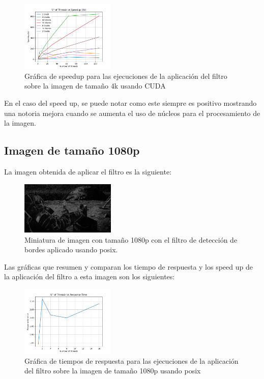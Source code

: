 \begin{figure}[H]
    \centering
    \includegraphics[width=0.4\textwidth]{../plots/cuda_4k_speedup.png}
    \caption{Gráfica de speedup para las ejecuciones de la aplicación del filtro sobre la imagen de tamaño 4k usando CUDA}
\end{figure}

En el caso del speed up, se puede notar como este siempre es positivo mostrando una notoria mejora cuando se aumenta el uso de núcleos para el procesamiento de la imagen.

\subsection{Imagen de tamaño 1080p}

La imagen obtenida de aplicar el filtro es la siguiente:

\begin{figure}[H]
    \centering
    \includegraphics[width=0.4\textwidth]{../plots/1080p.out.jpg}
    \caption{Miniatura de imagen con tamaño 1080p con el filtro de detección de bordes aplicado usando posix.}
\end{figure}

Las gráficas que resumen y comparan los tiempo de respuesta y los speed up de la aplicación del filtro a esta imagen son los siguientes:

\begin{figure}[H]
    \centering
    \includegraphics[width=0.4\textwidth]{../plots/1080p_response_time.png}
    \caption{Gráfica de tiempos de respuesta para las ejecuciones de la aplicación del filtro sobre la imagen de tamaño 1080p usando posix}
\end{figure}

